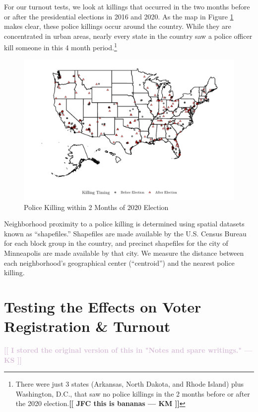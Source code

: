 \documentclass[12pt]{article}
\newcommand{\kscomment}[1]{\textbf{\textcolor{Thistle}{[[ #1 --- KS ]]}}}
\newcommand{\kmcomment}[1]{\textbf{\textcolor{JungleGreen}{[[ #1 --- KM ]]}}}
\begin{document}
For our turnout tests, we look at killings that occurred in the two months before or after the presidential elections in 2016 and 2020. As the map in Figure \ref{fig:map-chunk} makes clear, these police killings occur around the country. While they are concentrated in urban areas, nearly every state in the country saw a police officer kill someone in this 4 month period.\footnote{There were just 3 states (Arkansas, North Dakota, and Rhode Island) plus Washington, D.C., that saw no police killings in the 2 months before or after the 2020 election.\kmcomment{JFC this is bananas}}

\begin{figure}[!t]
\centering 
\includegraphics[width=\linewidth]{Figures/map-1} 
\caption{Police Killing within 2 Months of 2020 Election}
\label{fig:map-chunk}
\end{figure}

Neighborhood proximity to a police killing is determined using spatial datasets known as ``shapefiles.'' Shapefiles are made available by the U.S. Census Bureau for each block group in the country, and precinct shapefiles for the city of Minneapolis are made available by that city. We measure the distance between each neighborhood's geographical center (``centroid'') and the nearest police killing.

\section*{Testing the Effects on Voter Registration \& Turnout}

\kscomment{I stored the original version of this in "Notes and spare writings."}
\end{document}
